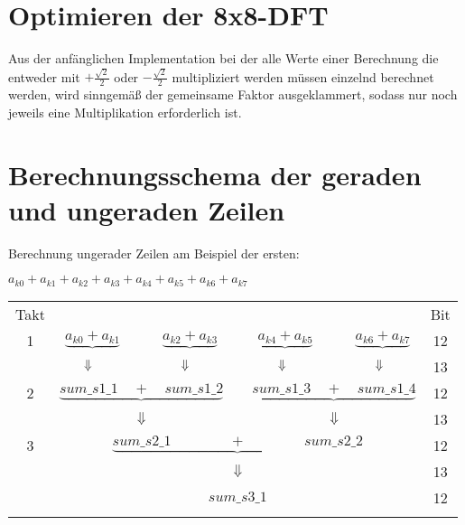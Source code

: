 \section{Optimieren der 8x8-DFT}

Aus der anfänglichen Implementation bei der alle Werte einer Berechnung die entweder mit $+\frac{\sqrt{2}}{2}$ oder $-\frac{\sqrt{2}}{2}$ multipliziert werden müssen 
einzelnd berechnet werden, wird sinngemäß der gemeinsame Faktor ausgeklammert, sodass nur noch jeweils eine Multiplikation erforderlich ist.





\section{Berechnungsschema der geraden und ungeraden Zeilen}

Berechnung ungerader Zeilen am Beispiel der ersten:
\begin{center}
$a_{k0} + a_{k1} + a_{k2} + a_{k3} + a_{k4} + a_{k5} + a_{k6} + a_{k7}$\\
\end{center}
\vspace{0.5cm}

\begin{tabular}{ccccccccc}
Takt&\multicolumn{6}{l}{ } & & Bit\\
1&$\underbrace{a_{k0} + a_{k1}}$ &  &$ \underbrace{a_{k2} + a_{k3}}$ &  &$\underbrace{a_{k4} + a_{k5}}$ &  &$\underbrace{a_{k6} + a_{k7}}$ & 12\\
&\multicolumn{7}{l}{$\hspace{0.65cm} \Downarrow \hspace{2.5cm} \Downarrow \hspace{2.5cm} \Downarrow \hspace{2.5cm}\Downarrow$}&13\\
2&\multicolumn{3}{c}{$\underbrace{sum\_s1\_1 \quad + \quad sum\_s1\_2}$} & & \multicolumn{3}{c}{$\underbrace{sum\_s1\_3 \quad + \quad sum\_s1\_4}$} & 12\\
&\multicolumn{3}{c}{$\Downarrow$} & & \multicolumn{3}{c}{$\Downarrow$}&13\\
3&\multicolumn{7}{c}{$\underbrace{sum\_s2\_1 \quad  \quad \quad \quad + \quad \quad \quad  \quad sum\_s2\_2}$} & 12\\
&\multicolumn{7}{c}{$\Downarrow$}&13\\
&\multicolumn{7}{c}{$sum\_s3\_1$} & 12\\
&\end{tabular}

